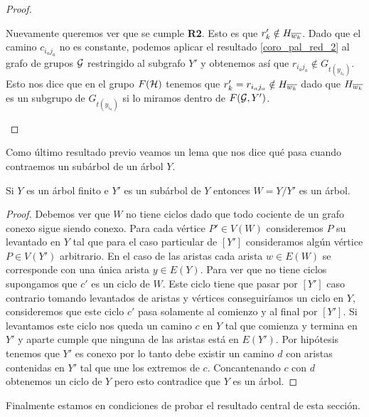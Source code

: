 \documentclass[tesis.tex]{subfiles}
\begin{document}
\begin{proof}
\begin{enumerate}[i)]
		Nuevamente queremos ver que se cumple \textbf{R2}. 
		Esto es que $r'_k \notin H_{\overline{w_k}}$.		
		Dado que el camino $c_{i_aj_a}$ no es constante, podemos aplicar el resultado \ref{coro_pal_red_2} al grafo de grupos ${\cal G}$ restringido al subgrafo $Y'$ y obtenemos así que $r_{i_aj_a} \notin G_{t(y_{i_a})}$.
		Esto nos dice que en el grupo $F({\cal H})$ tenemos que $r'_{k} = r_{i_aj_a} \notin H_{\overline{w_k}}$ dado que $H_{\overline{w_k}}$ es un subgrupo de $G_{t(y_{i_a})}$ si lo miramos dentro de $F({\cal G}, Y')$. 
	\end{enumerate}	
\end{proof}

Como último resultado previo veamos un lema que nos dice qué pasa cuando contraemos un subárbol de un árbol $Y$.

\begin{lema}\label{lema_subarbol_conexo}
	Si $Y$ es un árbol finito e $Y'$ es un subárbol de $Y$ entonces $W=Y/Y'$ es un árbol. 
\end{lema} 
\begin{proof}
	Debemos ver que $W$ no tiene ciclos dado que todo cociente de un grafo conexo sigue siendo conexo.
	Para cada vértice $P' \in V(W)$ consideremos $P$ su levantado en $Y$ tal que para el caso particular de $[Y']$ consideramos algún vértice $P \in V(Y')$ arbitrario.
	En el caso de las aristas cada arista $w \in E(W)$ se corresponde con una única arista $y \in E(Y)$.
	Para ver que no tiene ciclos supongamos que $c'$ es un ciclo de $W$.
	Este ciclo tiene que pasar por $[Y']$ caso contrario tomando levantados de aristas y vértices conseguiríamos un ciclo en $Y$, consideremos que este ciclo $c'$ pasa solamente al comienzo y al final por $[Y']$.
	Si levantamos este ciclo nos queda un camino $c$ en $Y$ tal que comienza y termina en $Y'$ y aparte cumple que ninguna de las aristas está en $E(Y')$.
	Por hipótesis tenemos que $Y'$ es conexo por lo tanto debe existir un camino $d$ con aristas contenidas en $Y'$ tal que une los extremos de $c$. 
	Concantenando $c$ con $d$ obtenemos un ciclo de $Y$ pero esto contradice que $Y$ es un árbol.
	
\end{proof}


Finalmente estamos en condiciones de probar el resultado central de esta sección. 
\end{document}
